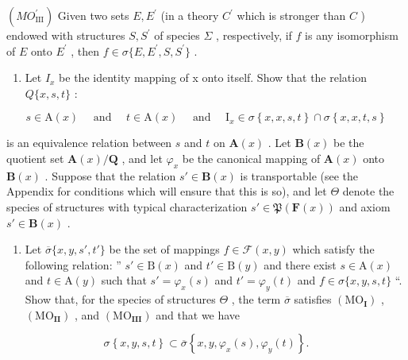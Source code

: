 \((MO_{\mathrm{III}}^{\prime})\) Given two sets \(E, E^{\prime}\) (in a theory \(C^{\prime}\) which is stronger than \(C\) ) endowed with structures \(S, S^{\prime}\) of species \(\Sigma\) , respectively, if \(f\) is any isomorphism of \(E\) onto \(E^{\prime}\) , then \(f \in \sigma \{E, E^{\prime}, S, S^{\prime}\}\) .

\begin{enumerate}
\def\labelenumi{(\alph{enumi})}
\tightlist
\item
  Let \(I_{x}\) be the identity mapping of x onto itself. Show that the relation \(Q\{x, s, t\}\) :
\end{enumerate}

\[
s \in \mathrm{A} (x) \quad \text { and } \quad t \in \mathrm{A} (x) \quad \text { and } \quad \mathrm{I} _ {x} \in \sigma \left\{x, x, s, t \right\} \cap \sigma \left\{x, x, t, s \right\}
\]

is an equivalence relation between \(s\) and \(t\) on \(\mathbf{A}(x)\) . Let \(\mathbf{B}(x)\) be the quotient set \(\mathbf{A}(x)/\mathbf{Q}\) , and let \(\varphi_x\) be the canonical mapping of \(\mathbf{A}(x)\) onto \(\mathbf{B}(x)\) . Suppose that the relation \(s' \in \mathbf{B}(x)\) is transportable (see the Appendix for conditions which will ensure that this is so), and let \(\Theta\) denote the species of structures with typical characterization \(s' \in \mathfrak{P}(\mathbf{F}(x))\) and axiom \(s' \in \mathbf{B}(x)\) .

\begin{enumerate}
\def\labelenumi{(\alph{enumi})}
\setcounter{enumi}{1}
\tightlist
\item
  Let \(\overline{\sigma}\{x, y, s', t'\}\) be the set of mappings \(f \in \mathcal{F}(x, y)\) which satisfy the following relation: '' \(s' \in \mathrm{B}(x)\) and \(t' \in \mathrm{B}(y)\) and there exist \(s \in \mathrm{A}(x)\) and \(t \in \mathrm{A}(y)\) such that \(s' = \varphi_x(s)\) and \(t' = \varphi_y(t)\) and \(f \in \sigma\{x, y, s, t\}\) ``. Show that, for the species of structures \(\Theta\) , the term \(\overline{\sigma}\) satisfies \((\mathrm{MO}_{\mathbf{I}})\) , \((\mathrm{MO}_{\mathbf{II}})\) , and \((\mathrm{MO}_{\mathbf{III}})\) and that we have
\end{enumerate}

\[
\sigma \left\{x, y, s, t \right\} \subset \overline {{\sigma}} \left\{x, y, \varphi_ {x} (s), \varphi_ {y} (t) \right\}.
\]

